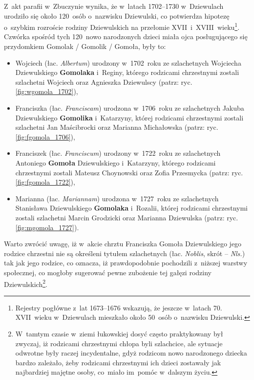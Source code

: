 Z~akt parafii w~Zbuczynie wynika, że w~latach 1702--1730 w~Dziewulach urodziło 
się około 120~osób o~nazwisku Dziewulski, co potwierdza hipotezę o~szybkim 
rozroście rodziny Dziewulskich na przełomie 
XVII~i~XVIII~wieku\footnote{Rejestry pogłówne z~lat 1673--1676 wskazują, że 
jeszcze w~latach 70. XVII~wieku w~Dziewulach mieszkało około 50~osób 
o~nazwisku Dziewulski.}. Czwórka spośród tych 120~nowo narodzonych dzieci 
miała ojca posługującego się przydomkiem Gomolak / Gomolik / Gomoła, były to:

\begin{itemize}
\item Wojciech (łac. \emph{Albertum}) urodzony w~1702~roku ze szlachetnych 
Wojciecha Dziewulskiego \textbf{Gomolaka} i~Reginy, którego rodzicami 
chrzestnymi zostali szlachetni Wojciech oraz Agnieszka Dziewulscy (patrz: 
ryc. \ref{fig:wgomola_1702}),
\item Franciszka (łac. \emph{Franciscam}) urodzona w~1706~roku ze 
szlachetnych Jakuba Dziewulskiego \textbf{Gomolika} i~Katarzyny, której 
rodzicami chrzestnymi zostali szlachetni Jan Maścibrocki oraz Marianna 
Michałowska (patrz: ryc. \ref{fig:fgomola_1706}),
\item Franciszek (łac. \emph{Franciscum}) urodzony w~1722~roku ze 
szlachetnych Antoniego \textbf{Gomoła} Dziewulskiego i~Katarzyny, którego 
rodzicami chrzestnymi zostali Mateusz Choynowski oraz Zofia Przesmycka 
(patrz: ryc. \ref{fig:fgomola_1722}),
\item Marianna (łac. \emph{Mariannam}) urodzona w~1727~roku ze szlachetnych 
Stanisława Dziewulskiego \textbf{Gomolaka} i~Rozalii, której rodzicami 
chrzestnymi zostali szlachetni Marcin Grodzicki oraz Marianna Dziewulska 
(patrz: ryc. \ref{fig:mgomola_1727}).
\end{itemize}

Warto zwrócić uwagę, iż w~akcie chrztu Franciszka Gomoła Dziewulskiego jego 
rodzice chrzestni nie są określeni tytułem szlachetnych (łac. \emph{Noblis}, 
skrót -- \emph{Nls.}) tak jak jego rodzice, co oznacza, iż prawdopodobnie 
pochodzili z~niższej warstwy społecznej, co mogłoby sugerować pewne zubożenie 
tej gałęzi rodziny Dziewulskich\footnote{W~tamtym czasie w~ziemi łukowskiej 
dosyć często praktykowany był zwyczaj, iż rodzicami chrzestnymi chłopa byli 
szlachcice, ale sytuacje odwrotne były raczej incydentalne, gdyż rodzicom 
nowo narodzonego dziecka bardzo zależało, żeby rodzicami chrzestnymi ich 
dzieci zostawały jak najbardziej majętne osoby, co~miało im~pomóc w~dalszym 
życiu.}. 

